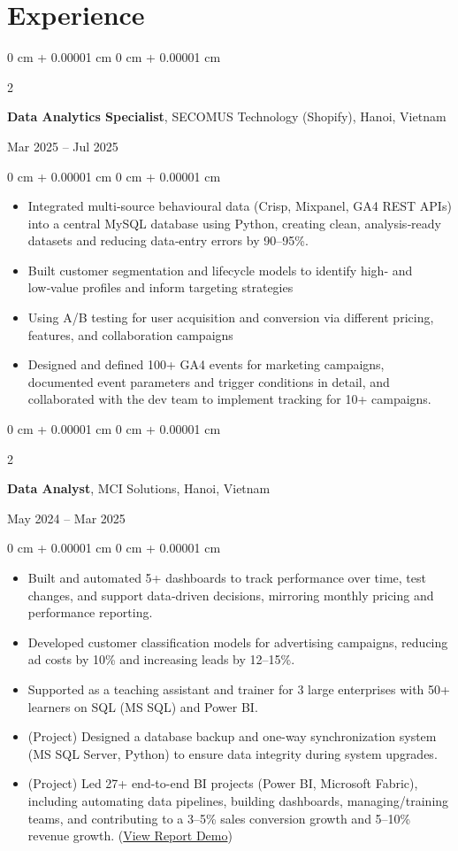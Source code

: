 \documentclass[10pt, letterpaper]{article}
\newenvironment{highlights}{
    \begin{itemize}[
        topsep=0.10 cm,
        parsep=0.10 cm,
        partopsep=0pt,
        itemsep=0pt,
        leftmargin=0 cm + 10pt
    ]
}{
    \end{itemize}
}
\newenvironment{onecolentry}{
    \begin{adjustwidth}{
        0 cm + 0.00001 cm
    }{
        0 cm + 0.00001 cm
    }
}{
    \end{adjustwidth}
}
\newenvironment{twocolentry}[2][]{
    \onecolentry
    \def\secondColumn{#2}
    \setcolumnwidth{\fill, 4.5 cm}
    \begin{paracol}{2}
}{
    \switchcolumn \raggedleft \secondColumn
    \end{paracol}
    \endonecolentry
}
\begin{document}
\section{Experience}
\begin{twocolentry}{
    Mar 2025 -- Jul 2025
}
    \textbf{Data Analytics Specialist}, SECOMUS Technology (Shopify), Hanoi, Vietnam
\end{twocolentry}
\begin{onecolentry}
    \begin{highlights}
        \item Integrated multi‑source behavioural data (Crisp, Mixpanel, GA4 REST APIs) into a central MySQL database using Python, creating clean, analysis‑ready datasets and reducing data‑entry errors by 90–95\%.
        \item Built customer segmentation and lifecycle models to identify high‑ and low‑value profiles and inform targeting strategies
        \item Using A/B testing for user acquisition and conversion via different pricing, features, and collaboration campaigns
        \item Designed and defined 100+ GA4 events for marketing campaigns, documented event parameters and trigger conditions in detail, and collaborated with the dev team to implement tracking for 10+ campaigns.
    \end{highlights}
\end{onecolentry}
\vspace{0.15cm}
\begin{twocolentry}{
    May 2024 -- Mar 2025
}
    \textbf{Data Analyst}, MCI Solutions, Hanoi, Vietnam
\end{twocolentry}
\begin{onecolentry}
    \begin{highlights}
        \item Built and automated 5+ dashboards to track performance over time, test changes, and support data‑driven decisions, mirroring monthly pricing and performance reporting.
        \item Developed customer classification models for advertising campaigns, reducing ad costs by 10\% and increasing leads by 12--15\%.
        \item Supported as a teaching assistant and trainer for 3 large enterprises with 50+ learners on SQL (MS SQL) and Power BI.
        \item (Project) Designed a database backup and one-way synchronization system (MS SQL Server, Python) to ensure data integrity during system upgrades.
        \item (Project) Led 27+ end-to-end BI projects (Power BI, Microsoft Fabric), including automating data pipelines, building dashboards, managing/training teams, and contributing to a 3--5\% sales conversion growth and 5--10\% revenue growth.
        (\href{https://drive.google.com/drive/folders/1AfFvo3vzXdFX2Btgv0eut2VleD6L5Cr7?usp=drive_link}{View Report Demo})
    \end{highlights}
\end{onecolentry}
\end{document}

